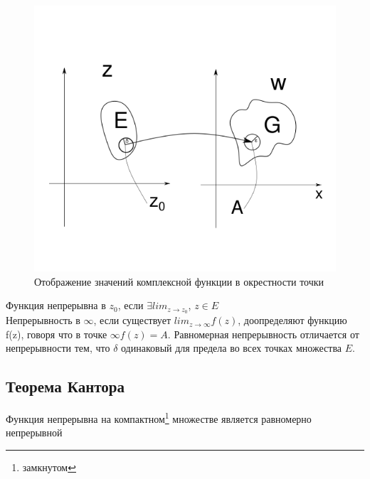 \documentclass{article}
\begin{document}
            \begin{figure}[H]
                  \includegraphics[width=0.6\linewidth]{complex_imagine_example2}
                  \caption{Отображение значений комплексной функции в окрестности точки}
                  \label{ris:complex_imagine_example2}
            \end{figure}
            Функция непрерывна в $z_{0}$, если $\exists lim_{z \rightarrow z_{0}}$, $z \in E$\\
            Непрерывность в $\infty$, если существует $lim_{z \rightarrow \infty} f(z)$, доопределяют функцию f(z), говоря что в точке $\infty f(z)=A$. Равномерная непрерывность отличается от непрерывности тем, что $\delta$ одинаковый для предела во всех точках множества $E$.
            \newpage
            \subsection{Теорема Кантора}
            Функция непрерывна на компактном\footnote{замкнутом} множестве является равномерно непрерывной
\end{document}
